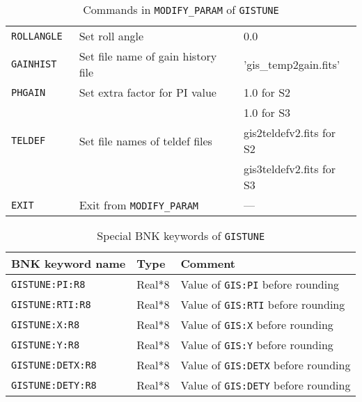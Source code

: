 \begin{table}[htb]
\begin{minipage}{\textwidth}
\begin{center}
\begin{tabular}{|l|l|l|}
{\tt ROLLANGLE }
	& Set roll angle
	& 0.0 \\
{\tt GAINHIST}
	& Set file name of gain history file
	& 'gis\_temp2gain.fits' \\
{\tt PHGAIN }
	& Set extra factor for PI value
	& 1.0 for S2 \\
	& 
	& 1.0 for S3 \\
{\tt TELDEF }
	& Set file names of teldef files
	& gis2teldefv2.fits for S2 \\
	& 
	& gis3teldefv2.fits for S3 \\
{\tt EXIT}
	& Exit from {\tt MODIFY\_PARAM}
	& --- \\ \hline
\end{tabular}
\end{center}
\end{minipage}
\caption{Commands in {\tt MODIFY\_PARAM} of {\tt GISTUNE}}
\label{tab:GISTUNE:MODIFY_PARAM}
\end{table}

\begin{table}[htb]
\begin{minipage}{\textwidth}
\begin{center}
\begin{tabular}{|l|l|l|}
\hline
BNK keyword name & Type & Comment \\ \hline
{\tt GISTUNE:PI:R8}
	& Real*8
	& Value of {\tt GIS:PI} before rounding \\
{\tt GISTUNE:RTI:R8}
	& Real*8
	& Value of {\tt GIS:RTI} before rounding \\
{\tt GISTUNE:X:R8}
	& Real*8
	& Value of {\tt GIS:X} before rounding \\
{\tt GISTUNE:Y:R8}
	& Real*8
	& Value of {\tt GIS:Y} before rounding \\
{\tt GISTUNE:DETX:R8}
	& Real*8
	& Value of {\tt GIS:DETX} before rounding \\
{\tt GISTUNE:DETY:R8}
	& Real*8
	& Value of {\tt GIS:DETY} before rounding \\
\hline
\end{tabular}
\end{center}
\end{minipage}
\caption{Special BNK keywords of {\tt GISTUNE}}
\label{tab:GISTUNE:SpecialBNK}
\end{table}

